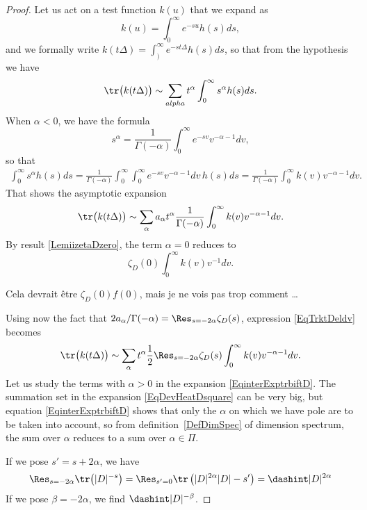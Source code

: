 \begin{proof}
Let us act on a test function $k(u)$ that we expand as
\[
  k(u)=\int_0^{\infty} e^{-su}h(s)ds,
\]
and we formally write $k(t\Delta)=\int_)^{\infty} e^{-st\Delta}h(s)ds$, so that from the hypothesis we have
\begin{equation}
\tr\big( k(t\Delta) \big)\sim \sum_{alpha}t^{\alpha}\int_0^\infty s^{\alpha}h(s)ds.
\end{equation}
When $\alpha<0$, we have the formula
\[
  s^{\alpha}=\frac{1}{ \Gamma(-\alpha) }\int_0^{\infty} e^{-sv}v^{-\alpha-1}dv,
\]
so that
\begin{align*}
\int_0^{\infty}s^{\alpha}h(s)ds	=\frac{1}{ \Gamma(-\alpha) }\int_0^{\infty}\int_0^{\infty} e^{-sv}v^{-\alpha-1}dv\,h(s)ds
				=\frac{1}{ \Gamma(-\alpha) }\int_0^{\infty}k(v)v^{-\alpha-1}dv.
\end{align*}
That shows the asymptotic expansion
\begin{equation}		\label{EqTrktDeldv}
\tr\big( k(t\Delta) \big)\sim \sum_{\alpha}a_{\alpha}t^{\alpha}\frac{1}{ \Gamma(-\alpha) }\int_0^{\infty}k(v)v^{-\alpha-1}dv.
\end{equation}
By result \eqref{LemiizetaDzero}, the term $\alpha=0$ reduces to
\[
  \zeta_D(0)\int_0^{\infty}k(v)v^{-1}dv.
\]
\begin{probleme}
Cela devrait être $\zeta_D(0)f(0)$, mais je ne vois pas trop comment \ldots
\end{probleme}
Using now the fact that $2 a_{\alpha}/\Gamma(-\alpha)=\Res_{s=-2\alpha}\zeta_D(s)$, expression \eqref{EqTrktDeldv} becomes
\begin{equation}		\label{EqinterExptrbiftD}
  \tr\big( k(t\Delta) \big)\sim \sum_{\alpha}t^{\alpha}\frac{ 1 }{2}\Res_{s=-2\alpha}\zeta_D(s)\int_0^{\infty}k(v)v^{-\alpha-1}dv.
\end{equation}
Let us study the terms with $\alpha>0$ in the expansion \eqref{EqinterExptrbiftD}. The summation set in the expansion \eqref{EqDevHeatDsquare} can be very big, but equation \eqref{EqinterExptrbiftD} shows that only the $\alpha$ on which we have pole are to be taken into account, so from definition~\ref{DefDimSpec} of dimension spectrum, the sum over $\alpha$ reduces to a sum over $\alpha\in\Pi$.

If we pose $s'=s+2\alpha$, we have
\[
  \Res_{s=-2\alpha}\tr\big( | D |^{-s} \big)=\Res_{s'=0}\tr\left( | D |^{2\alpha}| D |-s' \right)=\dashint| D |^{2\alpha}
\]
If we pose $\beta=-2\alpha$, we find $\dashint| D |^{-\beta}$.

\end{proof}


